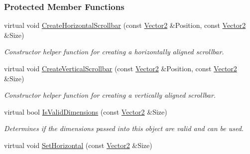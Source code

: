 \subsubsection*{Protected Member Functions}
\begin{DoxyCompactItemize}
\item 
\hypertarget{classphys_1_1UI_1_1Scrollbar_a47fac0a138c92b56f61681799e76cc27}{
virtual void \hyperlink{classphys_1_1UI_1_1Scrollbar_a47fac0a138c92b56f61681799e76cc27}{CreateHorizontalScrollbar} (const \hyperlink{classphys_1_1Vector2}{Vector2} \&Position, const \hyperlink{classphys_1_1Vector2}{Vector2} \&Size)}
\label{classphys_1_1UI_1_1Scrollbar_a47fac0a138c92b56f61681799e76cc27}

\begin{DoxyCompactList}\small\item\em Constructor helper function for creating a horizontally aligned scrollbar. \item\end{DoxyCompactList}\item 
\hypertarget{classphys_1_1UI_1_1Scrollbar_a7e703aee21212630777f151005498997}{
virtual void \hyperlink{classphys_1_1UI_1_1Scrollbar_a7e703aee21212630777f151005498997}{CreateVerticalScrollbar} (const \hyperlink{classphys_1_1Vector2}{Vector2} \&Position, const \hyperlink{classphys_1_1Vector2}{Vector2} \&Size)}
\label{classphys_1_1UI_1_1Scrollbar_a7e703aee21212630777f151005498997}

\begin{DoxyCompactList}\small\item\em Constructor helper function for creating a vertically aligned scrollbar. \item\end{DoxyCompactList}\item 
\hypertarget{classphys_1_1UI_1_1Scrollbar_a4953ac8c0b711ed9c1be468897e09ce8}{
virtual bool \hyperlink{classphys_1_1UI_1_1Scrollbar_a4953ac8c0b711ed9c1be468897e09ce8}{IsValidDimensions} (const \hyperlink{classphys_1_1Vector2}{Vector2} \&Size)}
\label{classphys_1_1UI_1_1Scrollbar_a4953ac8c0b711ed9c1be468897e09ce8}

\begin{DoxyCompactList}\small\item\em Determines if the dimensions passed into this object are valid and can be used. \item\end{DoxyCompactList}\item 
\hypertarget{classphys_1_1UI_1_1Scrollbar_acb5622bfb508d54f7802811e5dda4704}{
virtual void \hyperlink{classphys_1_1UI_1_1Scrollbar_acb5622bfb508d54f7802811e5dda4704}{SetHorizontal} (const \hyperlink{classphys_1_1Vector2}{Vector2} \&Size)}
\label{classphys_1_1UI_1_1Scrollbar_acb5622bfb508d54f7802811e5dda4704}


\end{DoxyCompactItemize}
